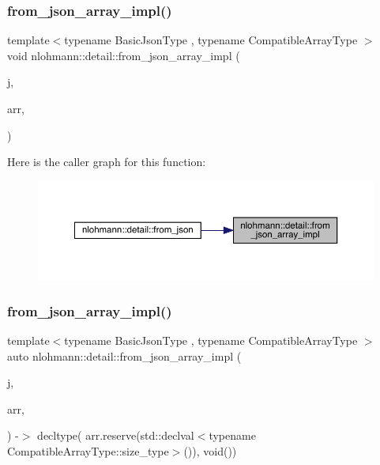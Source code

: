 \subsubsection{\texorpdfstring{from\_json\_array\_impl()}{from\_json\_array\_impl()}\hspace{0.1cm}{\footnotesize\ttfamily [1/2]}}
{\footnotesize\ttfamily template$<$typename Basic\+Json\+Type , typename Compatible\+Array\+Type $>$ \\
void nlohmann\+::detail\+::from\+\_\+json\+\_\+array\+\_\+impl (\begin{DoxyParamCaption}\item[{const Basic\+Json\+Type \&}]{j,  }\item[{Compatible\+Array\+Type \&}]{arr,  }\item[{\mbox{\hyperlink{structnlohmann_1_1detail_1_1priority__tag}{priority\+\_\+tag}}$<$ 0 $>$}]{ }\end{DoxyParamCaption})}

Here is the caller graph for this function\+:\nopagebreak
\begin{figure}[H]
\begin{center}
\leavevmode
\includegraphics[width=350pt]{namespacenlohmann_1_1detail_ac53673a5ce29fb69b96d41dad33cb3b0_icgraph}
\end{center}
\end{figure}
\mbox{\label{namespacenlohmann_1_1detail_a57f93ed57254a1639087cdc316e0fb83}} 
\subsubsection{\texorpdfstring{from\_json\_array\_impl()}{from\_json\_array\_impl()}\hspace{0.1cm}{\footnotesize\ttfamily [2/2]}}
{\footnotesize\ttfamily template$<$typename Basic\+Json\+Type , typename Compatible\+Array\+Type $>$ \\
auto nlohmann\+::detail\+::from\+\_\+json\+\_\+array\+\_\+impl (\begin{DoxyParamCaption}\item[{const Basic\+Json\+Type \&}]{j,  }\item[{Compatible\+Array\+Type \&}]{arr,  }\item[{\mbox{\hyperlink{structnlohmann_1_1detail_1_1priority__tag}{priority\+\_\+tag}}$<$ 1 $>$}]{ }\end{DoxyParamCaption}) -\/$>$ decltype(
    arr.\+reserve(std\+::declval$<$typename Compatible\+Array\+Type\+::size\+\_\+type$>$()),
    void())
}

